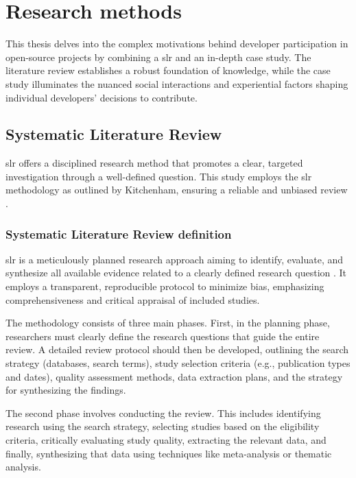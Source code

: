 \section{Research methods}

This thesis delves into the complex motivations behind developer participation in open-source projects by combining a \ac{slr} and an in-depth case study. The literature review establishes a robust foundation of knowledge, while the case study illuminates the nuanced social interactions and experiential factors shaping individual developers' decisions to contribute.

\subsection{Systematic Literature Review} \label{slr}

\ac{slr} offers a disciplined research method that promotes a clear, targeted investigation through a well-defined question. This study employs the \ac{slr} methodology as outlined by Kitchenham, ensuring a reliable and unbiased review \cite{Kitchenham}.

\subsubsection{Systematic Literature Review definition}

\ac{slr} is a meticulously planned research approach aiming to identify, evaluate, and synthesize all available evidence related to a clearly defined research question \cite{Kitchenham}. It employs a transparent, reproducible protocol to minimize bias, emphasizing comprehensiveness and critical appraisal of included studies. 

The methodology consists of three main phases. First, in the planning phase, researchers must clearly define the research questions that guide the entire review. A detailed review protocol should then be developed, outlining the search strategy (databases, search terms), study selection criteria (e.g., publication types and dates), quality assessment methods, data extraction plans, and the strategy for synthesizing the findings.

The second phase involves conducting the review. This includes identifying research using the search strategy, selecting studies based on the eligibility criteria, critically evaluating study quality, extracting the relevant data, and finally, synthesizing that data using techniques like meta-analysis or thematic analysis.


